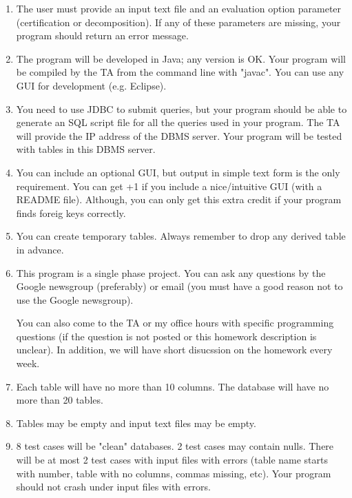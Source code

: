 \begin{enumerate}

\item The user must provide an input text file and an evaluation option parameter (certification or decomposition). %
If any of these parameters
are missing, your program should return an error message. 

\item The program will be developed in Java; any version is OK. Your program will be compiled 
by the TA from the command line with "javac". 
You can use any GUI for development (e.g. Eclipse).

\item You need to use JDBC to submit queries, but your program should be able to generate an SQL script file for all the queries used in your program.
The TA will provide the IP address of the DBMS server.
Your program will be tested with tables in this DBMS server.

\item You can include an optional GUI, but output in simple text form is the only requirement. You can get +1 if you include a nice/intuitive GUI (with a README file). 
Although, you can only get this extra credit if your program 
finds foreig keys correctly.

\item 
You can create temporary tables.
Always remember to drop any derived table in advance.

\item This program is a single phase project. 
You can ask any questions by the Google newsgroup (preferably) 
or email (you must have a good reason not to use the Google newsgroup). 

You can also come to the TA or my office hours with specific programming questions
(if the question is not posted or this homework description is unclear).
In addition, we will have short disucssion on the homework every week.

\item Each table will have no more than 10 columns.
The database will have no more than 20 tables.

\item Tables may be empty and input text files may be empty.

\item 8 test cases will be "clean" databases. 2 test cases may contain nulls.
There will be at most 2 test cases with input files with errors 
(table name starts with number, table with no columns, commas missing, etc).
Your program should not crash under input files with errors.


\end{enumerate}


